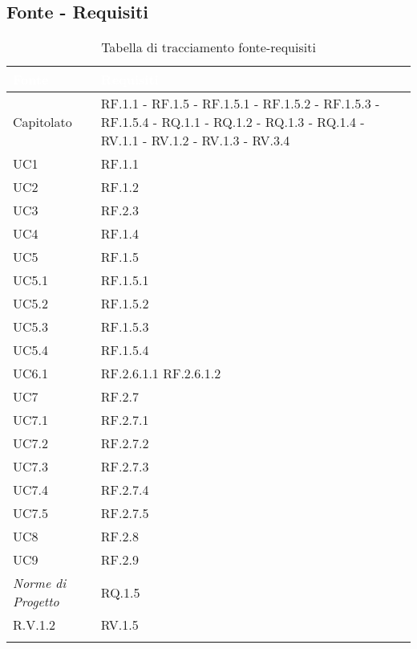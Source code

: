 \subsection{Fonte - Requisiti}
\begin{center}
  \centering
  \begin{longtable}{|C{6cm}|C{6cm}|}
    \hline
    \textcolor[HTML]{FFFFFF}{\textbf{Fonte}} & \textcolor[HTML]{FFFFFF}{\textbf{Requisiti}} \\ \hline
    Capitolato & RF.1.1 - RF.1.5 - RF.1.5.1 - RF.1.5.2 - RF.1.5.3 - RF.1.5.4 - RQ.1.1 - RQ.1.2 - RQ.1.3 - RQ.1.4 - RV.1.1 - RV.1.2 - RV.1.3 - RV.3.4 \\ \hline
    UC1 & RF.1.1 \\ \hline
    UC2 & RF.1.2 \\ \hline
    UC3 & RF.2.3 \\ \hline
    UC4 & RF.1.4 \\ \hline
    UC5 & RF.1.5 \\ \hline
    UC5.1 & RF.1.5.1 \\ \hline
    UC5.2 & RF.1.5.2 \\ \hline
    UC5.3 & RF.1.5.3 \\ \hline
    UC5.4 & RF.1.5.4 \\ \hline
    UC6.1 & RF.2.6.1.1 RF.2.6.1.2 \\ \hline
    UC7 & RF.2.7 \\ \hline
    UC7.1 & RF.2.7.1 \\ \hline
    UC7.2 & RF.2.7.2 \\ \hline
    UC7.3 & RF.2.7.3 \\ \hline
    UC7.4 & RF.2.7.4 \\ \hline
    UC7.5 & RF.2.7.5 \\ \hline
    UC8 & RF.2.8 \\ \hline
    UC9 & RF.2.9 \\ \hline
    \textit{Norme di Progetto} & RQ.1.5 \\ \hline
    R.V.1.2 & RV.1.5 \\ \hline

    \caption{Tabella di tracciamento fonte-requisiti}
  \end{longtable}
\end{center}

